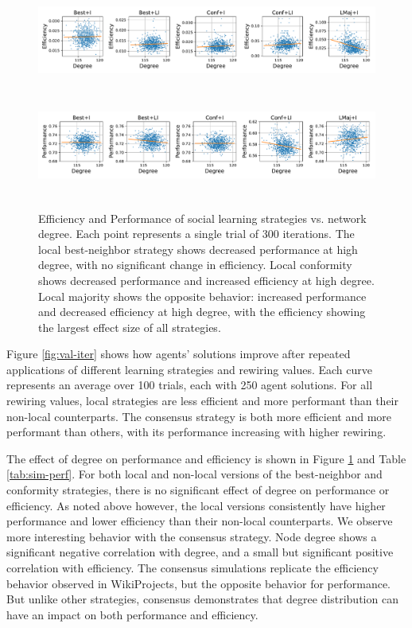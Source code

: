 \begin{figure}
\includegraphics[width=6.67in,height=1.33in]{fig-deg-eff.pdf}
\includegraphics[width=6.67in,height=1.33in]{fig-deg-perf.pdf}
\caption{
Efficiency and Performance of social learning strategies vs. network degree.
Each point represents a single trial of 300 iterations.
The local best-neighbor strategy shows
decreased performance at high degree,
with no significant change in efficiency.
Local conformity shows decreased performance and increased efficiency at high
degree.
Local majority shows the opposite behavior:
increased performance and decreased efficiency at high degree,
with the efficiency showing the largest effect size of all strategies.
\label{fig:deg-eff-perf}
}
\end{figure}

Figure \ref{fig:val-iter} shows how agents' solutions improve after repeated applications of
different learning strategies and rewiring values.
Each curve represents an average over 100 trials, each with 250 agent solutions.
For all rewiring values, local strategies are less efficient and more performant than their
non-local counterparts.
The consensus strategy is both more efficient and more performant than others,
with its performance increasing with higher rewiring.

The effect of degree on performance and efficiency is shown in Figure \ref{fig:deg-eff-perf} and
Table \ref{tab:sim-perf}.
For both local and non-local versions of the best-neighbor and conformity strategies,
there is no significant effect of degree on performance or efficiency.
As noted above however, the local versions consistently have higher performance and lower efficiency
than their non-local counterparts.
We observe more interesting behavior with the consensus strategy.
Node degree shows a significant negative correlation with degree,
and a small but significant positive correlation with efficiency.
The consensus simulations replicate the efficiency behavior observed in WikiProjects,
but the opposite behavior for performance.
But unlike other strategies, consensus demonstrates that degree distribution can have an
impact on both performance and efficiency.

